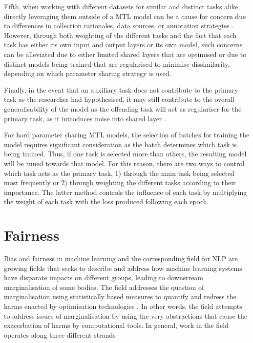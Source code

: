 Fifth, when working with different datasets for similar and distinct tasks alike, directly leveraging them outside of a MTL model can be a cause for concern due to differences in collection rationales, data sources, or annotation strategies \cite{Waseem:2018}. 
However, through both weighting of the different tasks and the fact that each task has either its own input and output layers or its own model, such concerns can be alleviated due to either limited shared layers that are optimised or due to distinct models being trained that are regularised to minimise dissimilarity, depending on which parameter sharing strategy is used.

Finally, in the event that an auxiliary task does not contribute to the primary task as the researcher had hypothesised, it may still contribute to the overall generalisability of the model as the offending task will act as regulariser for the primary task, as it introduces noise into shared layer \citep{Bingel:2018}.

For hard parameter sharing MTL models, the selection of batches for training the model requires significant consideration as the batch determines which task is being trained. Thus, if one task is selected more than others, the resulting model will be tuned towards that model.
For this reason, there are two ways to control which task acts as the primary task, 1) through the main task being selected most frequently or 2) through weighting the different tasks according to their importance.
The latter method controls the influence of each task by multiplying the weight of each task with the loss produced following each epoch.

\section{Fairness}\label{sec:fairlitt}

Bias and fairness in machine learning and the corresponding field for NLP are growing fields that seeks to describe and address how machine learning systems have disparate impacts on different groups, leading to downstream marginalisation of some bodies.
The field addresses the question of marginalisation using statistically based measures to quantify and redress the harms enacted by optimisation technologies \citep{Kulynych:2020}.
In other words, the field attempts to address issues of marginalisation by using the very abstractions that cause the exacerbation of harms by computational tools.
In general, work in the field operates along three different strands

